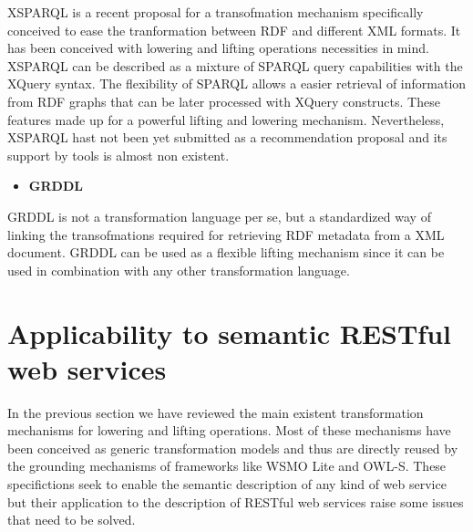 XSPARQL is a recent proposal for a transofmation mechanism specifically conceived to ease the tranformation between RDF and different XML formats. It has been conceived  with lowering and lifting operations necessities in mind. XSPARQL can be described as a mixture of SPARQL query capabilities with the XQuery syntax. The flexibility of SPARQL allows a easier retrieval of information from RDF graphs that can be later processed with XQuery constructs. These features made up for a powerful lifting and lowering mechanism. Nevertheless, XSPARQL hast not been yet submitted as a recommendation proposal and its support by tools is almost non existent.

\begin{itemize}
\item \bf{GRDDL}
\end{itemize}

GRDDL is not a transformation language per se, but a standardized way of linking the transofmations required for retrieving RDF metadata from a XML document. GRDDL can be used as a flexible lifting mechanism since it can be used in combination with any other transformation language.

\section{Applicability to semantic RESTful web services}

In the previous section we have reviewed the main existent transformation mechanisms for lowering and lifting operations. Most of these mechanisms have been conceived as generic transformation models and thus are directly reused by the grounding mechanisms of frameworks like WSMO Lite and OWL-S. These specifictions seek to enable the semantic description of any kind of web service but their application to the description of RESTful web services raise some issues that need to be solved.\\


